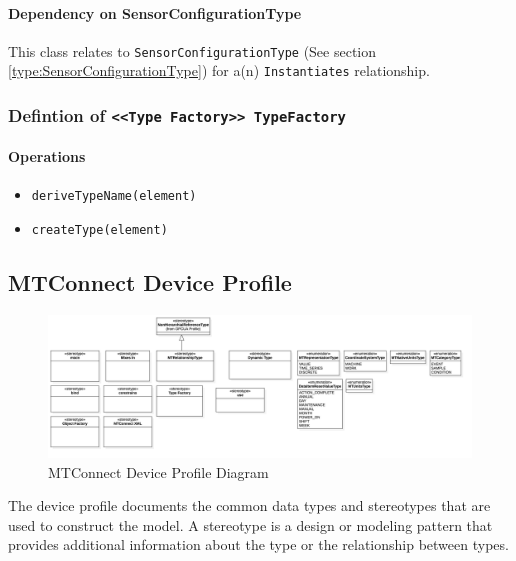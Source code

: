 \paragraph{Dependency on SensorConfigurationType}

This class relates to \texttt{SensorConfigurationType} (See section \ref{type:SensorConfigurationType}) for a(n) \texttt{Instantiates} relationship.

\FloatBarrier
\subsubsection{Defintion of \texttt{<<Type Factory>> TypeFactory}} \label{type:TypeFactory}

\FloatBarrier



\paragraph{Operations}
\begin{itemize}
  \item \texttt{deriveTypeName(element)}
  \item \texttt{createType(element)}
\end{itemize}
\FloatBarrier
\subsection{MTConnect Device Profile}

\begin{figure}[ht]
  \centering
    \includegraphics[width=1.0\textwidth]{diagrams/MTConnect Device Profile.png}
  \caption{MTConnect Device Profile Diagram}
  \label{fig:MTConnect Device Profile}
\end{figure}

\FloatBarrier


The device profile documents the common data types and stereotypes that are 
used to construct the model. A stereotype is a design or modeling pattern that 
provides additional information about the type or the relationship between types. 

